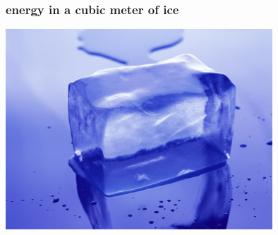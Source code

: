 \documentclass{beamer}
\begin{document}
\begin{frame}
  \frametitle{energy in a cubic meter of ice}

  \begin{center}
    \includegraphics[width=0.75\textwidth]{real-ice-cube.jpg}
  \end{center}
\end{frame}
\end{document}

